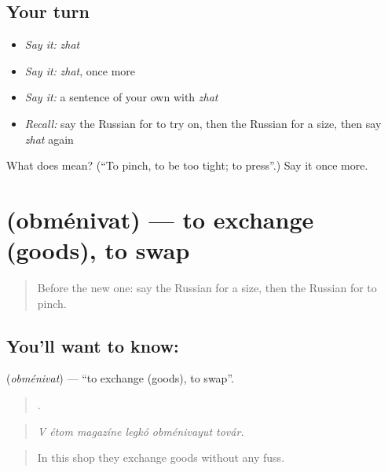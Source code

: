 \subsection*{Your turn}
\begin{itemize}
\raggedright
  \item \emph{Say it:} \emph{zhat}
  \item \emph{Say it:} \emph{zhat}, once more
  \item \emph{Say it:} a sentence of your own with \emph{zhat}
  \item \emph{Recall:} say the Russian for to try on, then the Russian for a size, then say \emph{zhat} again
\end{itemize}

\begin{tcolorbox}[breakable,colback=teal!4,colframe=teal!35!black,title={Before you move on}]
What does  mean? (\textquotedblleft{}To pinch, to be too tight; to press\textquotedblright{}.) Say it once more.
\end{tcolorbox}
\section[\texorpdfstring{\ru{обменивать} (obménivat)}{обменивать (obménivat)}]{ (obménivat) — to exchange (goods), to swap}

\label{lesson:RU-C453-obmenivat}



\begin{quote}
Before the new one: say the Russian for a size, then the Russian for to pinch.
\end{quote}

\subsection*{You'll want to know: }
\textbf{} (\emph{obménivat}) — \textquotedblleft{}to exchange (goods), to swap\textquotedblright{}.

\begin{quote}
     .
\end{quote}

\begin{quote}
\emph{V étom magazíne legkó obménivayut továr.}
\end{quote}

\begin{quote}
In this shop they exchange goods without any fuss.
\end{quote}

